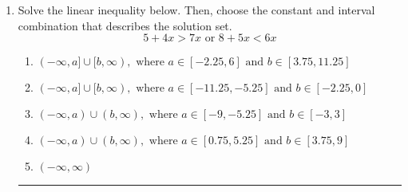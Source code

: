 \documentclass[14pt]{extbook}
\newcommand{\litem}[1]{\item#1\hspace*{-1cm}\rule{\textwidth}{0.4pt}}
\begin{document}
\begin{enumerate}
{\begin{enumerate}[label=\Alph*.]
\end{enumerate} }
\litem{
Solve the linear inequality below. Then, choose the constant and interval combination that describes the solution set.\[ 5 + 4 x > 7 x \text{ or } 8 + 5 x < 6 x \]\begin{enumerate}[label=\Alph*.]
\item \( (-\infty, a] \cup [b, \infty), \text{ where } a \in [-2.25, 6] \text{ and } b \in [3.75, 11.25] \)
\item \( (-\infty, a] \cup [b, \infty), \text{ where } a \in [-11.25, -5.25] \text{ and } b \in [-2.25, 0] \)
\item \( (-\infty, a) \cup (b, \infty), \text{ where } a \in [-9, -5.25] \text{ and } b \in [-3, 3] \)
\item \( (-\infty, a) \cup (b, \infty), \text{ where } a \in [0.75, 5.25] \text{ and } b \in [3.75, 9] \)
\item \( (-\infty, \infty) \)

\end{enumerate} }
\end{enumerate}
\end{document}
